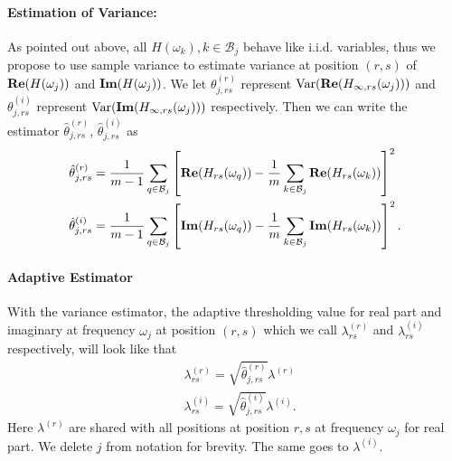 \paragraph{Estimation of Variance:}
As pointed out above, all $H(\omega_k), k\in \mathcal{B}_j$ behave like i.i.d. variables, thus we propose to use sample variance to estimate variance at position $(r, s)$ of ${\bf Re}(H(\omega_j))$ and 
${\bf Im}(H(\omega_j))$. We let $\theta^{(r)}_{j, rs}$ represent  $\mathrm{Var}({\bf Re}(H_{\infty, rs}(\omega_j)))$ and $\theta^{(i)}_{j, rs}$ represent $\mathrm{Var}({\bf Im}(H_{\infty, rs}(\omega_j)))$ respectively.  Then we can write the estimator $\hat{\theta}^{(r)}_{j,rs}$,  $\hat{\theta}^{(i)}_{j,rs} $ as 
\begin{equation}
\label{eq:variance_estimator}
\begin{aligned}
& \hat{\theta}^{(r)}_{j,rs} = \frac{1}{m-1}\sum_{q\in \mathcal{B}_j} \left[{\bf Re}(H_{rs}(\omega_q)) - \frac{1}{m}\sum_{k\in \mathcal{B}_j} {\bf Re}(H_{rs}(\omega_k))\right]^2 \\
&\hat{\theta}^{(i)}_{j,rs} = \frac{1}{m-1}\sum_{q\in \mathcal{B}_j} \left[{\bf Im}(H_{rs}(\omega_q)) - \frac{1}{m}\sum_{k\in \mathcal{B}_j} {\bf Im}(H_{rs}(\omega_k))\right]^2. 
\end{aligned}
\end{equation}

\paragraph{Adaptive Estimator}
With the variance estimator,  the adaptive thresholding value for real part and imaginary at frequency $\omega_j$ at position $(r, s)$ which we call $\lambda^{(r)}_{rs}$ and $\lambda^{(i)}_{rs}$ respectively, will look like that 
\begin{equation}
\begin{aligned}
& \lambda^{(r)}_{rs} = \sqrt{\hat{\theta}^{(r)}_{j, rs}} \lambda^{(r)} \\
& \lambda^{(i)}_{rs}= \sqrt{\hat{\theta}^{(i)}_{j, rs}} \lambda^{(i)}.
\end{aligned}
\end{equation}
Here $\lambda^{(r)}$ are shared with all positions at position $r,s$ at frequency $\omega_j$ for real part. We delete $j$ from notation for brevity. The same goes to $\lambda^{(i)}$. 


